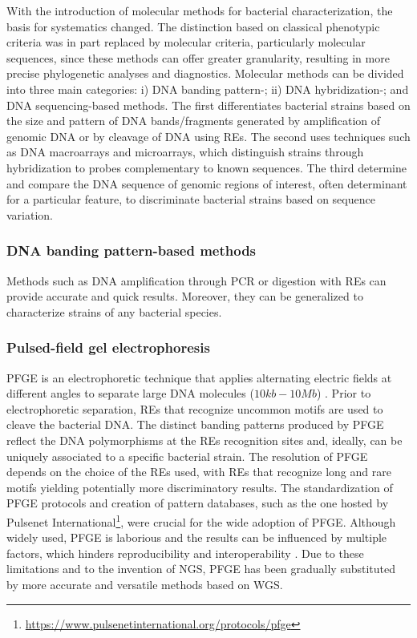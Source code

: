 With the introduction of molecular methods for bacterial characterization, the basis for systematics changed. The distinction based on classical phenotypic criteria was in part replaced by molecular criteria, particularly molecular sequences, since these methods can offer greater granularity, resulting in more precise phylogenetic analyses and diagnostics. Molecular methods can be divided into three main categories: i) \ac{DNA} banding pattern-; ii) \ac{DNA} hybridization-; and \ac{DNA} sequencing-based methods. The first differentiates bacterial strains based on the size and pattern of \ac{DNA} bands/fragments generated by amplification of genomic \ac{DNA} or by cleavage of \ac{DNA} using \ac{REs}. The second uses techniques such as \ac{DNA} macroarrays and microarrays, which distinguish strains through hybridization to probes complementary to known sequences. The third determine and compare the \ac{DNA} sequence of genomic regions of interest, often determinant for a particular feature, to discriminate bacterial strains based on sequence variation.

\subsubsection{DNA banding pattern-based methods}

Methods such as \ac{DNA} amplification through \ac{PCR} or digestion with \ac{REs} can provide accurate and quick results. Moreover, they can be generalized to characterize strains of any bacterial species.

\subsubsection{Pulsed-field gel electrophoresis}

\ac{PFGE} is an electrophoretic technique that applies alternating electric fields at different angles to separate large \ac{DNA} molecules ($10kb-10Mb$) \cite{schwartz_separation_1984, herschleb_pulsed-field_2007}. Prior to electrophoretic separation, \ac{REs} that recognize uncommon motifs are used to cleave the bacterial \ac{DNA}. The distinct banding patterns produced by \ac{PFGE} reflect the \ac{DNA} polymorphisms at the \ac{REs} recognition sites and, ideally, can be uniquely associated to a specific bacterial strain. The resolution of \ac{PFGE} depends on the choice of the \ac{REs} used, with \ac{REs} that recognize long and rare motifs yielding potentially more discriminatory results. The standardization of \ac{PFGE} protocols and creation of pattern databases, such as the one hosted by Pulsenet International\footnote{\url{https://www.pulsenetinternational.org/protocols/pfge}}, were crucial for the wide adoption of \ac{PFGE}. Although widely used, \ac{PFGE} is laborious and the results can be influenced by multiple factors, which hinders reproducibility and interoperability \cite{li_bacterial_2009}. Due to these limitations and to the invention of \ac{NGS}, \ac{PFGE} has been gradually substituted by more accurate and versatile methods based on \ac{WGS}.

